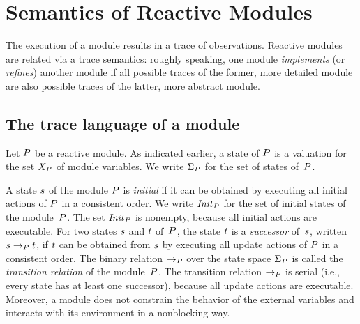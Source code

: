 \section{Semantics of Reactive Modules}

The execution of a module results in a trace of observations.
Reactive modules are related via a trace semantics:
roughly speaking, one module {\em implements\/} (or {\em refines\/}) another
module if all possible traces of the former, more detailed module are also
possible traces of the latter, more abstract module.


\subsection{The trace language of a module}

Let ${P}$ be a reactive module.
As indicated earlier, a state of ${P}$ is a valuation for the set
$X_{{P}}$ of module variables.
We write $\Sigma_{P}$ for the set of states of~${P}$.

\mypar
A state $s$ of the module ${P}$ is {\em initial\/} if it can be obtained
by executing all initial actions of ${P}$ in a consistent order.
We write ${\it Init}_{{P}}$ for the set of initial states of the module~${P}$.
The set ${\it Init}_{{P}}$ is nonempty, because all initial actions are executable.
For two states $s$ and $t$ of~${P}$, the state $t$ is a
{\em successor\/} of~$s$, written $s\rightarrow_{P}t$, if
$t$ can be obtained from $s$ by executing all update actions of
${P}$ in a consistent order.
The binary relation $\rightarrow_{P}$ over the state space $\Sigma_{P}$ is called
the {\em transition relation\/} of the module~${P}$.
The transition relation $\rightarrow_{P}$ is serial
(i.e., every state has at least one successor), because all update actions
are executable.
Moreover, a module does not constrain the behavior of the external variables
and interacts with its environment in a nonblocking way.


